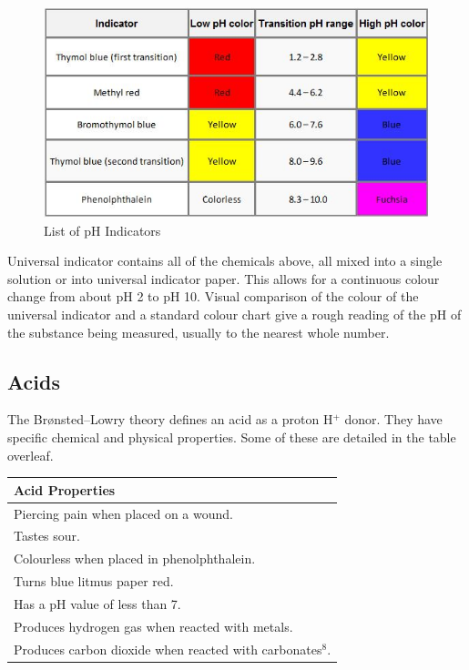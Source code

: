 \begin{figure}[H]
    \includegraphics[width=\textwidth]{./Planning/Images/Indicators.jpg}
    \caption{List of pH Indicators} \label{fig:pH Indicators}
\end{figure}

Universal indicator contains all of the chemicals above, all mixed into a single solution or into universal indicator paper. This allows for a continuous colour change from about pH 2 to pH 10. Visual comparison of the colour of the universal indicator and a standard colour chart give a rough reading of the pH of the substance being measured, usually to the nearest whole number. 


	\subsection{Acids} 

The Brønsted–Lowry theory defines an acid as a proton H$^+$ donor. They have specific chemical and physical properties. Some of these are detailed in the table overleaf.

\begin{center}
\begin{tabular}{|l|}
    \hline
    \textbf{Acid Properties}  \\ \hline
Piercing pain when placed on a wound. \\ \hline
Tastes sour. \\ \hline
Colourless when placed in phenolphthalein. \\ \hline
Turns blue litmus paper red. \\ \hline
Has a pH value of less than 7. \\ \hline
Produces hydrogen gas when reacted with metals. \\ \hline
Produces carbon dioxide when reacted with carbonates$^8$. \\ \hline
\end{tabular}

\label{tab:Acid Properties}
\end{center}

